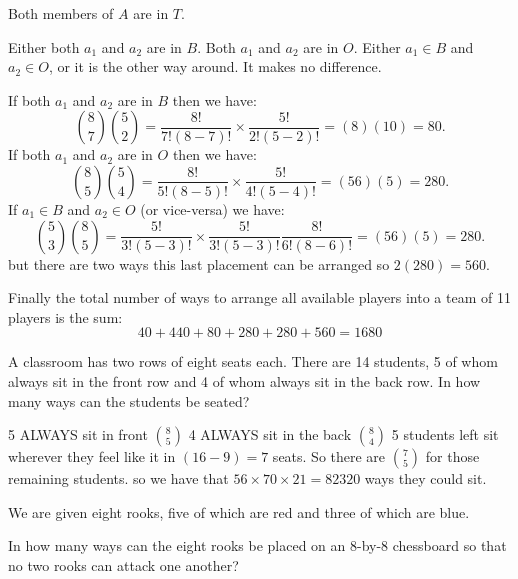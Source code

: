 \begin{case}{ Both members of ${A}$ are in ${T}$.} 


 Either both $a_{1}$ and $a_{2}$ are in ${B}$.
 Both $a_{1}$ and $a_{2}$ are in ${O}$.
 Either $a_{1} \in {B}$ and $a_{2} \in {O}$, or it is the other way around. It makes no difference. 



If both $a_{1}$ and $a_{2}$ are in ${B}$ then we have: 
\[\binom{8}{7} \binom{5}{2} = \frac{8!}{7!(8-7)!} \times \frac{5!}{2!(5-2)!} = (8)(10) = 80.\]
If both  $a_{1}$ and $a_{2}$ are in ${O}$ then we have: 
\[\binom{8}{5} \binom{5}{4} = \frac{8!}{5!(8-5)!} \times \frac{5!}{4!(5-4)!} = (56)(5) = 280.\]
If $a_{1} \in {B}$ and $a_{2} \in {O}$ (or vice-versa) we have: 
\[\binom{5}{3} \binom{8}{5} = \frac{5!}{3!(5-3)!} \times \frac{5!}{3!(5-3)!} \frac{8!}{6!(8-6)!} = (56)(5) = 280.\]
but there are two ways this last placement can be arranged so $2(280) = 560$. 

Finally the total number of ways to arrange all available players into a team of 11 players is the sum: 
\[40 + 440 + 80 + 280 + 280 + 560 = 1680\]
\end{case}

\bigskip

\begin{prob}
A classroom has two rows of eight seats each. There are 14 students, 5 of whom always sit in the front row and 4 of whom always sit in the back row. In how many ways  can the students be seated?
\end{prob}
\medskip

\begin{sol}

5 ALWAYS sit in front $\binom{8}{5}$
4 ALWAYS sit in the back $\binom{8}{4}$
5 students left sit wherever they feel like it in $(16-9) = 7$ seats. So there are $\binom{7}{5}$ for those remaining students. 
so we have that $56 \times 70 \times 21 = 82320$ ways they could sit.
\end{sol}
\bigskip

\begin{prob}
We are given eight rooks, five of which are red and three of which are blue.
\smallskip

 In how many ways can the eight rooks be placed on an 8-by-8 chessboard so that no two rooks can attack one another?
\end{prob}
\medskip

